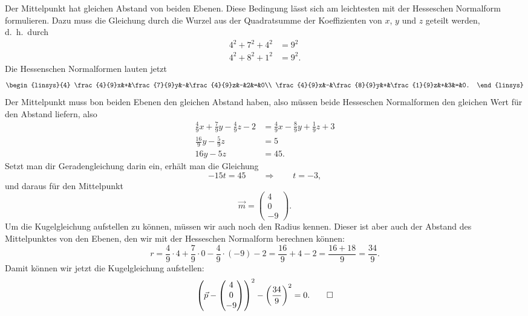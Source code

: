 \begin{loesung}
Der Mittelpunkt hat gleichen Abstand von beiden Ebenen. 
Diese Bedingung lässt sich am leichtesten mit der Hesseschen Normalform
formulieren.
Dazu muss die Gleichung durch die Wurzel aus der Quadratsumme der
Koeffizienten von $x$, $y$ und $z$ geteilt werden, d.~h.~durch
\begin{align*}
4^2+7^2+4^2&=9^2\\
4^2+8^2+1^2&=9^2.
\end{align*}
Die Hessenschen Normalformen lauten jetzt
\[
\begin{linsys}{4}
\frac{4}{9}x&+&\frac{7}{9}y&-&\frac{4}{9}z&-&2&=&0\\
\frac{4}{9}x&-&\frac{8}{9}y&+&\frac{1}{9}z&+&3&=&0.
\end{linsys}
\]
Der Mittelpunkt muss bon beiden Ebenen den gleichen Abstand haben,
also müssen beide Hesseschen Normalformen den gleichen Wert für den Abstand
liefern, also
\begin{align*}
\frac{4}{9}x+\frac{7}{9}y-\frac{4}{9}z-2&=
\frac{4}{9}x-\frac{8}{9}y+\frac{1}{9}z+3
\\
\frac{16}{9}y-\frac{5}{9}z&=5
\\
16y-5z&=45.
\end{align*}
Setzt man dir Geradengleichung darin ein, erhält man die Gleichung
\[
-15t=45
\qquad\Rightarrow\qquad t=-3,
\]
und daraus für den Mittelpunkt
\[
\vec m=\begin{pmatrix}4\\0\\-9\end{pmatrix}.
\]
Um die Kugelgleichung aufstellen zu können, müssen wir auch noch den
Radius kennen.
Dieser ist aber auch der Abstand des Mittelpunktes von den Ebenen,
den wir mit der Hesseschen Normalform berechnen können:
\[
r
=
\frac{4}{9}\cdot 4+\frac{7}{9}\cdot 0-\frac{4}{9}\cdot (-9)-2
=
\frac{16}{9}+4-2
=
\frac{16+18}{9}
=
\frac{34}{9}.
\]
Damit können wir jetzt die Kugelgleichung aufstellen:
\[
\left(
\vec p - \begin{pmatrix}4\\0\\-9\end{pmatrix}
\right)^2-\biggl(\frac{34}{9}\biggr)^2=0.
\qedhere
\]
\end{loesung}
